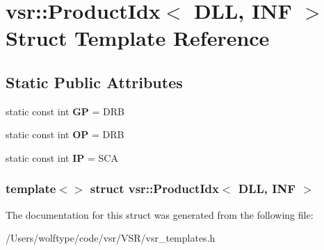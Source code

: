 \hypertarget{structvsr_1_1_product_idx_3_01_d_l_l_00_01_i_n_f_01_4}{\section{vsr\-:\-:Product\-Idx$<$ D\-L\-L, I\-N\-F $>$ Struct Template Reference}
\label{structvsr_1_1_product_idx_3_01_d_l_l_00_01_i_n_f_01_4}
}
\subsection*{Static Public Attributes}
\begin{DoxyCompactItemize}
\item 
\hypertarget{structvsr_1_1_product_idx_3_01_d_l_l_00_01_i_n_f_01_4_ab302aa5e5d146dbf7f337f2edb6c572e}{static const int {\bfseries G\-P} = D\-R\-B}\label{structvsr_1_1_product_idx_3_01_d_l_l_00_01_i_n_f_01_4_ab302aa5e5d146dbf7f337f2edb6c572e}

\item 
\hypertarget{structvsr_1_1_product_idx_3_01_d_l_l_00_01_i_n_f_01_4_ad71929abf720a1a2ec283c9118fcc92c}{static const int {\bfseries O\-P} = D\-R\-B}\label{structvsr_1_1_product_idx_3_01_d_l_l_00_01_i_n_f_01_4_ad71929abf720a1a2ec283c9118fcc92c}

\item 
\hypertarget{structvsr_1_1_product_idx_3_01_d_l_l_00_01_i_n_f_01_4_ab7602b40caa5ba22f2ae11a7bbe079f5}{static const int {\bfseries I\-P} = S\-C\-A}\label{structvsr_1_1_product_idx_3_01_d_l_l_00_01_i_n_f_01_4_ab7602b40caa5ba22f2ae11a7bbe079f5}

\end{DoxyCompactItemize}
\subsubsection*{template$<$$>$ struct vsr\-::\-Product\-Idx$<$ D\-L\-L, I\-N\-F $>$}



The documentation for this struct was generated from the following file\-:\begin{DoxyCompactItemize}
\item 
/\-Users/wolftype/code/vsr/\-V\-S\-R/vsr\-\_\-templates.\-h\end{DoxyCompactItemize}
